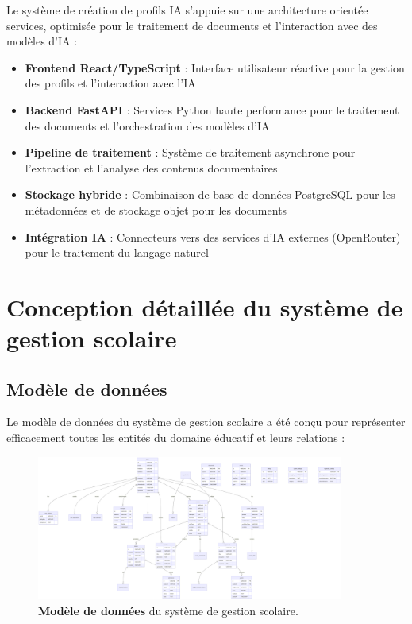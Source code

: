 Le système de création de profils IA s'appuie sur une architecture orientée services, optimisée pour le traitement de documents et l'interaction avec des modèles d'IA :

\begin{itemize}
  \item \textbf{Frontend React/TypeScript} : Interface utilisateur réactive pour la gestion des profils et l'interaction avec l'IA
  
  \item \textbf{Backend FastAPI} : Services Python haute performance pour le traitement des documents et l'orchestration des modèles d'IA
  
  \item \textbf{Pipeline de traitement} : Système de traitement asynchrone pour l'extraction et l'analyse des contenus documentaires
  
  \item \textbf{Stockage hybride} : Combinaison de base de données PostgreSQL pour les métadonnées et de stockage objet pour les documents
  
  \item \textbf{Intégration IA} : Connecteurs vers des services d'IA externes (OpenRouter) pour le traitement du langage naturel
\end{itemize}

\section{Conception détaillée du système de gestion scolaire}

\subsection{Modèle de données}

Le modèle de données du système de gestion scolaire a été conçu pour représenter efficacement toutes les entités du domaine éducatif et leurs relations :

\begin{figure}[H]
  \centering
  \includegraphics[width=0.9\textwidth,keepaspectratio]{pfe-pics/diagrames/tabaales.png}
  \caption{\textbf{Modèle de données} du système de gestion scolaire.}
  \label{fig:school_data_model}
\end{figure}

